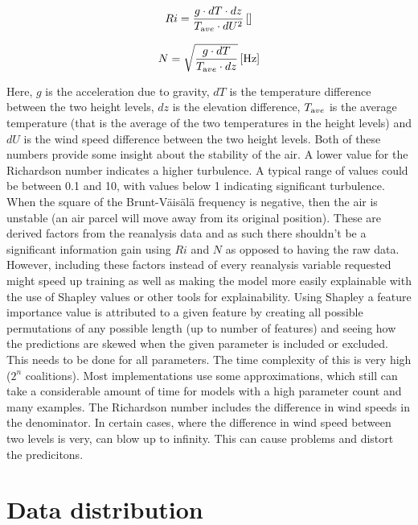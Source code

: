 \begin{equation}
    \label{eqn:Ri}
    Ri = \frac{g \cdot dT \cdot dz}{T_{\textrm ave} \cdot dU^2} \, \mathrm{[]}
\end{equation}

\begin{equation}
    \label{eqn:N}
    N = \sqrt{\frac{g \cdot dT }{T_{\textrm ave} \cdot dz}} \, \mathrm{[Hz]}
\end{equation}

Here, $g$ is the acceleration due to gravity, $dT$ is the temperature difference between the two height levels, $dz$ is the elevation difference, $T_{\textrm ave}$ is the average temperature (that is the average of the two temperatures in the height levels) and $dU$ is the wind speed difference between the two height levels. Both of these numbers provide some insight about the stability of the air. A lower value for the Richardson number indicates a higher turbulence. A typical range of values could be between 0.1 and 10, with values below 1 indicating significant turbulence\cite{richardson_number_skybrary}. When the square of the Brunt-Väisälä frequency is negative, then the air is unstable (an air parcel will move away from its original position)\cite{brunt_vaisala_freq_eumtrain}. These are derived factors from the reanalysis data and as such there shouldn't be a significant information gain using $Ri$ and $N$ as opposed to having the raw data. However, including these factors instead of every reanalysis variable requested might speed up training as well as making the model more easily explainable with the use of Shapley values or other tools for explainability. Using Shapley a feature importance value is attributed to a given feature by creating all possible permutations of any possible length (up to number of features) and seeing how the predictions are skewed when the given parameter is included or excluded. This needs to be done for all parameters. The time complexity of this is very high ($2^n$ coalitions)\cite{shapley_information}. Most implementations use some approximations, which still can take a considerable amount of time for models with a high parameter count and many examples. The Richardson number includes the difference in wind speeds in the denominator. In certain cases, where the difference in wind speed between two levels is very, can blow up to infinity. This can cause problems and distort the predicitons.

\section{Data distribution}

